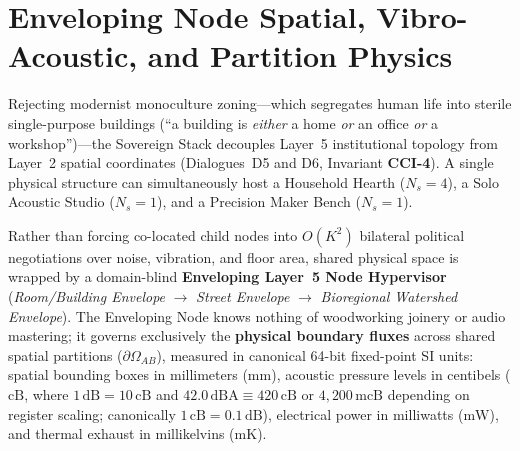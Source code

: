 \section{Enveloping Node Spatial, Vibro-Acoustic, and Partition Physics}
\label{sec:mech_enveloping_node_acoustics}

Rejecting modernist monoculture zoning---which segregates human life into sterile single-purpose buildings (``a building is \textit{either} a home \textit{or} an office \textit{or} a workshop'')---the Sovereign Stack decouples Layer~5 institutional topology from Layer~2 spatial coordinates (Dialogues~D5 and D6, Invariant \textbf{CCI-4}). A single physical structure can simultaneously host a Household Hearth ($N_s = 4$), a Solo Acoustic Studio ($N_s = 1$), and a Precision Maker Bench ($N_s = 1$). 

Rather than forcing co-located child nodes into $O(K^2)$ bilateral political negotiations over noise, vibration, and floor area, shared physical space is wrapped by a domain-blind \textbf{Enveloping Layer~5 Node Hypervisor} (\textit{Room/Building Envelope} $\to$ \textit{Street Envelope} $\to$ \textit{Bioregional Watershed Envelope}). The Enveloping Node knows nothing of woodworking joinery or audio mastering; it governs exclusively the \textbf{physical boundary fluxes} across shared spatial partitions ($\partial\Omega_{AB}$), measured in canonical 64-bit fixed-point SI units: spatial bounding boxes in millimeters ($\mathrm{mm}$), acoustic pressure levels in centibels ($\mathrm{cB}$, where $1\,\mathrm{dB} = 10\,\mathrm{cB}$ and $42.0\,\mathrm{dBA} \equiv 420\,\mathrm{cB}$ or $4{,}200\,\mathrm{mcB}$ depending on register scaling; canonically $1\,\mathrm{cB} = 0.1\,\mathrm{dB}$), electrical power in milliwatts ($\mathrm{mW}$), and thermal exhaust in millikelvins ($\mathrm{mK}$).

